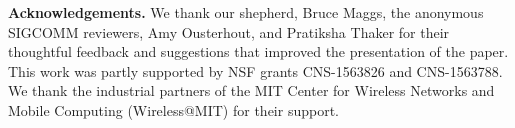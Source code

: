 
\medskip
\noindent
\textbf{Acknowledgements.} We thank our shepherd, Bruce Maggs, the anonymous SIGCOMM reviewers, Amy
Ousterhout, and Pratiksha Thaker for their thoughtful feedback and suggestions
that improved the presentation of the paper. This work was partly supported by
NSF grants CNS-1563826 and CNS-1563788. We thank the industrial partners of the
MIT Center for Wireless Networks and Mobile Computing (Wireless@MIT) for their
support.
